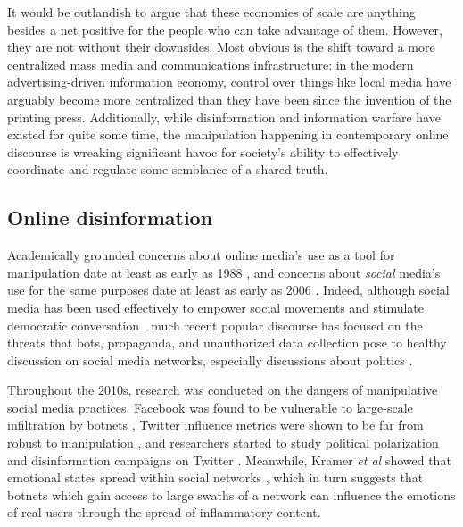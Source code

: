 \documentclass[sigconf,authordraft]{acmart}
\newcommand{\etal}{{\itshape et al }}
\begin{document}
It would be outlandish to argue that these economies of scale are anything besides a net positive
for the people who can take advantage of them. However, they are not without their downsides. Most
obvious is the shift toward a more centralized mass media and communications infrastructure: in the
modern advertising-driven information economy, control over things like local media have arguably
become more centralized than they have been since the invention of the printing press. Additionally,
while disinformation and information warfare have existed for quite some time, the manipulation
happening in contemporary online discourse is wreaking significant havoc for society's ability to
effectively coordinate and regulate some semblance of a shared truth.

\subsection{Online disinformation}

Academically grounded concerns about online media's use as a tool for manipulation date at least as
early as 1988 \cite{herman2010manufacturing}, and concerns about {\itshape social} media's use for
the same purposes date at least as early as 2006 \cite{howard2006new}. Indeed, although social media
has been used effectively to empower social movements and stimulate democratic conversation
\cite{conover2013digital, gonzalez2011dynamics, varol2014evolution}, much recent popular discourse
has focused on the threats that bots, propaganda, and unauthorized data collection pose to healthy
discussion on social media networks, especially discussions about politics
\cite{BBC_news_chatbot,BBC_news_fakenews,NYT_opinion_chatbot,CambridgeAnalyticaNYT}.

Throughout the 2010s, research was conducted on the dangers of manipulative social media practices. Facebook was found to be vulnerable to large-scale infiltration by botnets \cite{boshmaf2013design}, Twitter influence metrics were shown to be far from robust to manipulation \cite{messias2013you}, and researchers started to study political polarization and disinformation campaigns on Twitter \cite{ratkiewicz2011detecting,conover2011political}. Meanwhile, Kramer \etal showed that emotional states spread within social networks \cite{kramer2014experimental}, which in turn suggests that botnets which gain access to large swaths of a network can influence the emotions of real users through the spread of inflammatory content. 
\end{document}
